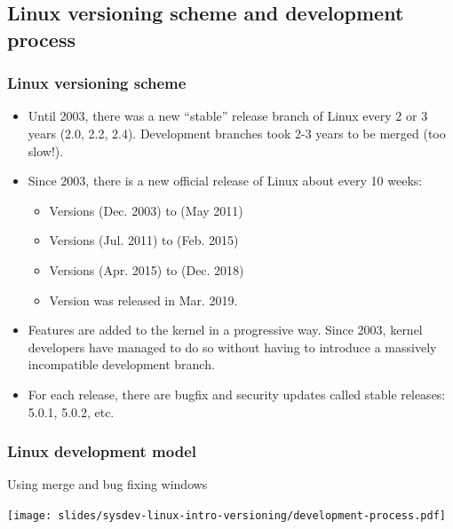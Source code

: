 \subsection{Linux versioning scheme and development process}

\begin{frame}
  \frametitle{Linux versioning scheme}
  \begin{itemize}
  \item Until 2003, there was a new ``stable'' release branch of Linux every
        2 or 3 years (2.0, 2.2, 2.4). Development branches took 2-3
        years to be merged (too slow!).
  \item Since 2003, there is a new official release of Linux about every
	10 weeks:
  \begin{itemize}
	\item Versions  (Dec. 2003) to  (May 2011)
	\item Versions  (Jul. 2011) to  (Feb. 2015)
	\item Versions  (Apr. 2015) to  (Dec. 2018)
	\item Version  was released in Mar. 2019.
  \end{itemize}
  \item Features are added to the kernel in a progressive way. Since
        2003, kernel developers have managed to do so without having
        to introduce a massively incompatible development branch.
  \item For each release, there are bugfix and security updates called
    stable releases: 5.0.1, 5.0.2, etc.
  \end{itemize}
\end{frame}

\begin{frame}
  \frametitle{Linux development model}
  Using merge and bug fixing windows
  \begin{center}
    \texttt{[image: slides/sysdev-linux-intro-versioning/development-process.pdf]}
  \end{center}
\end{frame}

